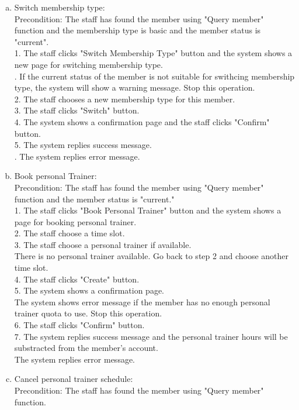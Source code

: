 \documentclass[11pt]{article}
\begin{document}
\begin{enumerate}[(a)]
\item Switch membership type:\\
Precondition: The staff has found the member using "Query member" function and the membership type is basic and the member status is "current".\\
1. The staff clicks "Switch Membership Type" button and the system shows a new page for switching membership type.\\
. If the current status of the member is not suitable for swithcing membership type, the system will show a warning message. Stop this operation.\\ 
2. The staff chooses a new membership type for this member.\\
3. The staff clicks "Switch" button.\\
4. The system shows a confirmation page and the staff clicks "Confirm" button.\\
5. The system replies success message.\\
. The system replies error message.
\item Book personal Trainer:\\
Precondition: The staff has found the member using "Query member" function and the member status is "current."\\
1. The staff clicks "Book Personal Trainer" button and the system shows a page for booking personal trainer.\\
2. The staff choose a time slot.\\
3. The staff choose a personal trainer if available.\\
 There is no personal trainer available. Go back to step 2 and choose another time slot.\\
4. The staff clicks "Create" button.\\
5. The system shows a confirmation page.\\
 The system shows error message if the member has no enough personal trainer quota to use. Stop this operation.\\
6. The staff clicks "Confirm" button.\\
7. The system replies success message and the personal trainer hours will be substracted from the member's account.\\
 The system replies error message.
\item Cancel personal trainer schedule:\\
Precondition: The staff has found the member using "Query member" function.\\

\end{enumerate}
\end{document}
